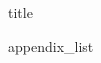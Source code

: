 \documentclass{article}
\begin{document}
{title}

\frontmatter

\tableofcontents







\addappendix
{appendix_list}

\end{document}
